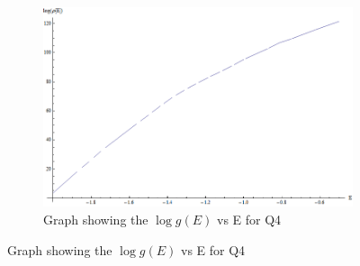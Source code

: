 \begin{figure}[H]
\begin{subfigure}[b]{0.45\textwidth}
    \includegraphics[width=\textwidth]{7-Appendices/intQ4Log(rho(E)).png}
    \caption{Graph showing the $\log{g\left(E\right)}$ vs E for Q4}
\end{subfigure}


\end{figure}
